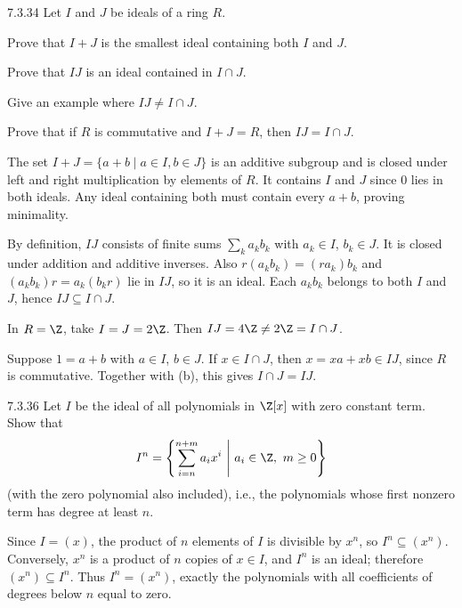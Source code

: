 \documentclass[11pt,oneside]{article}
\begin{document}

\begin{exercise}{7.3.34}
Let $I$ and $J$ be ideals of a ring $R$.
\begin{exercisesubparts}
\item Prove that $I+J$ is the smallest ideal containing both $I$ and $J$.
\item Prove that $IJ$ is an ideal contained in $I\cap J$.
\item Give an example where $IJ\ne I\cap J$.
\item Prove that if $R$ is commutative and $I+J=R$, then $IJ=I\cap J$.
\end{exercisesubparts}
\end{exercise}
\begin{solution}
\begin{exercisesubparts}
\item The set $I+J=\{a+b\mid a\in I,b\in J\}$ is an additive subgroup and is closed under left and right multiplication by elements of $R$. It contains $I$ and $J$ since $0$ lies in both ideals. Any ideal containing both must contain every $a+b$, proving minimality.
\item By definition, $IJ$ consists of finite sums $\sum_k a_kb_k$ with $a_k\in I$, $b_k\in J$. It is closed under addition and additive inverses. Also $r(a_kb_k)=(ra_k)b_k$ and $(a_kb_k)r=a_k(b_kr)$ lie in $IJ$, so it is an ideal. Each $a_kb_k$ belongs to both $I$ and $J$, hence $IJ\subseteq I\cap J$.
\item In $R=\Z$, take $I=J=2\Z$. Then $IJ=4\Z\ne 2\Z=I\cap J$.
\item Suppose $1=a+b$ with $a\in I$, $b\in J$. If $x\in I\cap J$, then $x=xa+xb\in IJ$, since $R$ is commutative. Together with (b), this gives $I\cap J=IJ$.
\end{exercisesubparts}
\end{solution}

\begin{exercise}{7.3.36}
Let $I$ be the ideal of all polynomials in $\Z[x]$ with zero constant term. Show that
\[
I^n=\left\{\sum_{i=n}^{n+m}a_ix^i\ \middle|\ a_i\in\Z,\ m\ge0\right\}
\]
(with the zero polynomial also included), i.e., the polynomials whose first nonzero term has degree at least $n$.
\end{exercise}
\begin{solution}
Since $I=(x)$, the product of $n$ elements of $I$ is divisible by $x^n$, so $I^n\subseteq(x^n)$. Conversely, $x^n$ is a product of $n$ copies of $x\in I$, and $I^n$ is an ideal; therefore $(x^n)\subseteq I^n$. Thus $I^n=(x^n)$, exactly the polynomials with all coefficients of degrees below $n$ equal to zero.
\end{solution}
\end{document}
